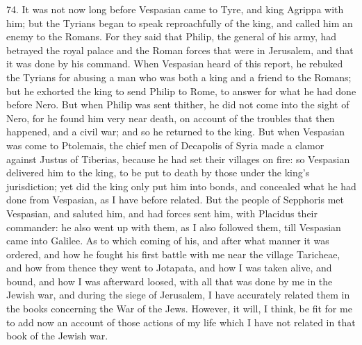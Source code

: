 74. It was not now long before Vespasian came to Tyre, and king Agrippa
with him; but the Tyrians began to speak reproachfully of the king, and
called him an enemy to the Romans. For they said that Philip, the general
of his army, had betrayed the royal palace and the Roman forces that were
in Jerusalem, and that it was done by his command. When Vespasian heard of
this report, he rebuked the Tyrians for abusing a man who was both a king
and a friend to the Romans; but he exhorted the king to send Philip to
Rome, to answer for what he had done before Nero. But when Philip was sent
thither, he did not come into the sight of Nero, for he found him very
near death, on account of the troubles that then happened, and a civil
war; and so he returned to the king. But when Vespasian was come to
Ptolemais, the chief men of Decapolis of Syria made a clamor against
Justus of Tiberias, because he had set their villages on fire: so
Vespasian delivered him to the king, to be put to death by those under the
king's jurisdiction; yet did the king only put him into bonds, and
concealed what he had done from Vespasian, as I have before related. But
the people of Sepphoris met Vespasian, and saluted him, and had forces
sent him, with Placidus their commander: he also went up with them, as I
also followed them, till Vespasian came into Galilee. As to which coming
of his, and after what manner it was ordered, and how he fought his first
battle with me near the village Taricheae, and how from thence they went
to Jotapata, and how I was taken alive, and bound, and how I was afterward
loosed, with all that was done by me in the Jewish war, and during the
siege of Jerusalem, I have accurately related them in the books concerning
the War of the Jews. However, it will, I think, be fit for me to add now
an account of those actions of my life which I have not related in that
book of the Jewish war.

